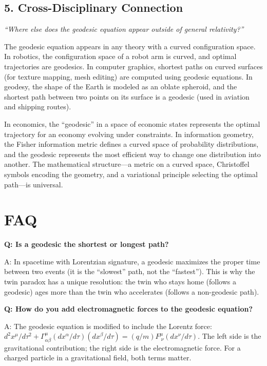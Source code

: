 \documentclass[11pt,openright]{book}
\begin{document}
\subsection*{5. Cross-Disciplinary Connection}
\textit{``Where else does the geodesic equation appear outside of general relativity?''}

The geodesic equation appears in any theory with a curved configuration space. In robotics, the configuration space of a robot arm is curved, and optimal trajectories are geodesics. In computer graphics, shortest paths on curved surfaces (for texture mapping, mesh editing) are computed using geodesic equations. In geodesy, the shape of the Earth is modeled as an oblate spheroid, and the shortest path between two points on its surface is a geodesic (used in aviation and shipping routes).

In economics, the ``geodesic'' in a space of economic states represents the optimal trajectory for an economy evolving under constraints. In information geometry, the Fisher information metric defines a curved space of probability distributions, and the geodesic represents the most efficient way to change one distribution into another. The mathematical structure---a metric on a curved space, Christoffel symbols encoding the geometry, and a variational principle selecting the optimal path---is universal.

\section*{FAQ}

\textbf{Q: Is a geodesic the shortest or longest path?}

A: In spacetime with Lorentzian signature, a geodesic maximizes the proper time between two events (it is the ``slowest'' path, not the ``fastest''). This is why the twin paradox has a unique resolution: the twin who stays home (follows a geodesic) ages more than the twin who accelerates (follows a non-geodesic path).

\textbf{Q: How do you add electromagnetic forces to the geodesic equation?}

A: The geodesic equation is modified to include the Lorentz force: $d^2 x^\mu/d\tau^2 + \Gamma^\mu_{\alpha\beta}(dx^\alpha/d\tau)(dx^\beta/d\tau) = (q/m)F^\mu_{\ \nu}(dx^\nu/d\tau)$. The left side is the gravitational contribution; the right side is the electromagnetic force. For a charged particle in a gravitational field, both terms matter.
\end{document}
